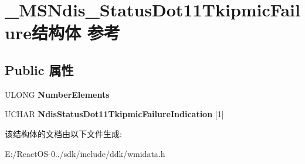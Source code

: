 \hypertarget{struct___m_s_ndis___status_dot11_tkipmic_failure}{}\section{\+\_\+\+M\+S\+Ndis\+\_\+\+Status\+Dot11\+Tkipmic\+Failure结构体 参考}
\label{struct___m_s_ndis___status_dot11_tkipmic_failure}
\subsection*{Public 属性}
\begin{DoxyCompactItemize}
\item 
\mbox{\label{struct___m_s_ndis___status_dot11_tkipmic_failure_ab686f17a9c36fe608b1ce02456ad3b9f}} 
U\+L\+O\+NG {\bfseries Number\+Elements}
\item 
\mbox{\label{struct___m_s_ndis___status_dot11_tkipmic_failure_aec8cce942ab84b3672d949d09cb20e05}} 
U\+C\+H\+AR {\bfseries Ndis\+Status\+Dot11\+Tkipmic\+Failure\+Indication} \mbox{[}1\mbox{]}
\end{DoxyCompactItemize}


该结构体的文档由以下文件生成\+:\begin{DoxyCompactItemize}
\item 
E\+:/\+React\+O\+S-\/0../sdk/include/ddk/wmidata.\+h\end{DoxyCompactItemize}
